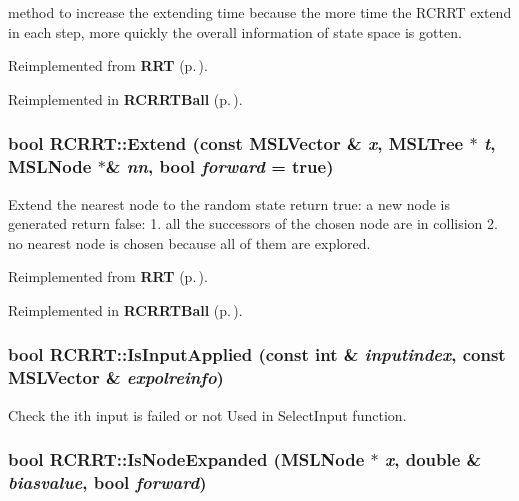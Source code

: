 method to increase the extending time because the more time the RCRRT extend in each step, more quickly the overall information of state space is gotten.



Reimplemented from {\bf RRT} {\rm (p.\,\pageref{classRRT_b3})}.

Reimplemented in {\bf RCRRTBall} {\rm (p.\,\pageref{classRCRRTBall_a4})}.
\subsubsection{\setlength{\rightskip}{0pt plus 5cm}bool RCRRT::Extend (const {\bf MSLVector} \& {\em x}, {\bf MSLTree} $\ast$ {\em t}, {\bf MSLNode} $\ast$\& {\em nn}, bool {\em forward} = true)\hspace{0.3cm}{\tt  [virtual]}}\label{classRCRRT_a7}


Extend the nearest node to the random state return true: a new node is generated return false: 1. all the successors of the chosen node are in collision 2. no nearest node is chosen because all of them are explored.



Reimplemented from {\bf RRT} {\rm (p.\,\pageref{classRRT_b2})}.

Reimplemented in {\bf RCRRTBall} {\rm (p.\,\pageref{classRCRRTBall_a3})}.
\subsubsection{\setlength{\rightskip}{0pt plus 5cm}bool RCRRT::Is\-Input\-Applied (const int \& {\em inputindex}, const {\bf MSLVector} \& {\em expolreinfo})\hspace{0.3cm}{\tt  [virtual]}}\label{classRCRRT_a1}


Check the ith input is failed or not Used in Select\-Input function.

\subsubsection{\setlength{\rightskip}{0pt plus 5cm}bool RCRRT::Is\-Node\-Expanded ({\bf MSLNode} $\ast$ {\em x}, double \& {\em biasvalue}, bool {\em forward})}\label{classRCRRT_a0}


